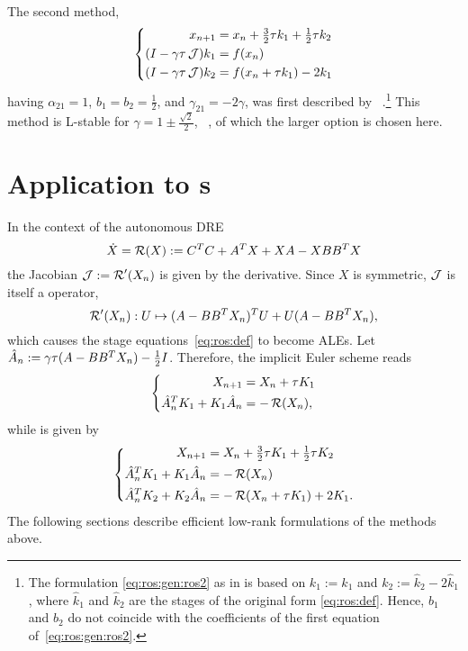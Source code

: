 The second method, 
\begin{equation}
\label{eq:ros:gen:ros2}
\left\{
\begin{aligned}
  x_{n+1} &= x_n + \tfrac{3}{2} \tau k_1 + \tfrac{1}{2} \tau k_2 \\
  (I - \gamma\tau \operatorname{\mathcal J}) k_1 &= f(x_n) \\
  (I - \gamma\tau \operatorname{\mathcal J}) k_2 &= f(x_n + \tau k_1) - 2k_1
\end{aligned}
\right.
\end{equation}
having $\alpha_{21}=1$, $b_1=b_2=\frac{1}{2}$, and $\gamma_{21}=-2\gamma$,
was first described by \citeauthor{Verwer1999}~\cite{Verwer1999}.\footnote{%
  The formulation \eqref{eq:ros:gen:ros2} as in \cite[Equation~(3.4)]{Verwer1999}
  is based on $k_1 := \hat k_1$ and $k_2 := \hat k_2 - 2 \hat k_1$,
  where $\hat k_1$ and $\hat k_2$ are the stages of the original form \eqref{eq:ros:def}.
  Hence, $b_1$ and $b_2$ do not coincide with the coefficients of the first equation of~\eqref{eq:ros:gen:ros2}.
}
This method is L-stable for $\gamma = 1 \pm \frac{\sqrt{2}}{2}$,
\cf~\cite[Table~6.4]{HairerWanner2},
of which the larger option is chosen here.

\section{Application to \texorpdfstring{s}{DREs}}

In the context of the autonomous \ac{DRE}
\begin{equation}
\label{eq:ros:DRE}
  \dot X = \operatorname{\mathcal R}(X) :=
  C^T C + A^T X + XA - X BB^T X
\end{equation}
the Jacobian $\operatorname{\mathcal J} := \operatorname{\mathcal R}'(X_n)$ is given by the \Frechet derivative.
Since $X$ is symmetric,
$\operatorname{\mathcal J}$ is itself a \Lyapunov operator,
\begin{equation}
  \operatorname{\mathcal R}'(X_n) : U \mapsto (A - BB^T X_n)^T U + U (A - BB^T X_n)
  ,
\end{equation}
which causes the stage equations~\eqref{eq:ros:def} to become \acp{ALE}.
Let $\hat A_n := \gamma\tau(A - BB^T X_n) - \frac{1}{2} I$.
Therefore,
the implicit Euler scheme  reads
\begin{equation}
\label{eq:ros:DRE:ros1}
\left\{
\begin{aligned}
  X_{n+1} &= X_n + \tau K_1 \\
  \hat A_n^T K_1 + K_1 \hat A_n &= -\operatorname{\mathcal R}(X_n)
  ,
\end{aligned}
\right.
\end{equation}
while  is given by
\begin{equation}
\label{eq:ros:DRE:ros2}
\left\{
\begin{aligned}
  X_{n+1} &= X_n + \tfrac{3}{2} \tau K_1 + \tfrac{1}{2} \tau K_2 \\
  \hat A_n^T K_1 + K_1 \hat A_n &= -\operatorname{\mathcal R}(X_n) \\
  \hat A_n^T K_2 + K_2 \hat A_n &= -\operatorname{\mathcal R}(X_n + \tau K_1) + 2K_1
  .
\end{aligned}
\right.
\end{equation}
The following sections describe efficient low-rank formulations of the methods above.

